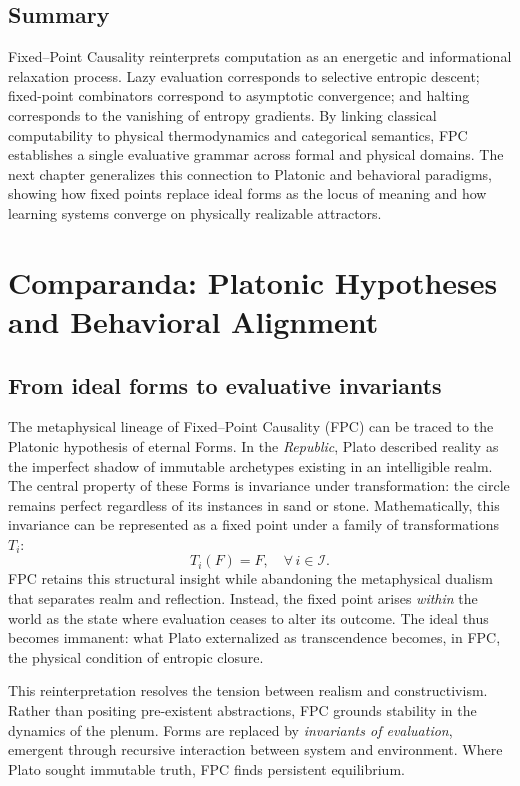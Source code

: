 \documentclass[12pt,a4paper]{article}
\theoremstyle{plain}
\begin{document}
\subsection{Summary}
Fixed--Point Causality reinterprets computation as an energetic and informational relaxation process.  
Lazy evaluation corresponds to selective entropic descent; 
fixed-point combinators correspond to asymptotic convergence; 
and halting corresponds to the vanishing of entropy gradients.
By linking classical computability to physical thermodynamics and categorical semantics, FPC establishes a single evaluative grammar across formal and physical domains.
The next chapter generalizes this connection to Platonic and behavioral paradigms, showing how fixed points replace ideal forms as the locus of meaning and how learning systems converge on physically realizable attractors.


\section{Comparanda: Platonic Hypotheses and Behavioral Alignment}
\label{sec:comparanda}

\subsection{From ideal forms to evaluative invariants}
The metaphysical lineage of Fixed--Point Causality (FPC) can be traced to the Platonic hypothesis of eternal Forms.  
In the \textit{Republic}, Plato described reality as the imperfect shadow of immutable archetypes existing in an intelligible realm.  
The central property of these Forms is invariance under transformation: the circle remains perfect regardless of its instances in sand or stone.  
Mathematically, this invariance can be represented as a fixed point under a family of transformations \(T_i\):
\[
T_i(F)=F , \quad \forall\, i \in \mathcal{I}.
\]
FPC retains this structural insight while abandoning the metaphysical dualism that separates realm and reflection.
Instead, the fixed point arises \emph{within} the world as the state where evaluation ceases to alter its outcome.
The ideal thus becomes immanent: what Plato externalized as transcendence becomes, in FPC, the physical condition of entropic closure.

This reinterpretation resolves the tension between realism and constructivism.
Rather than positing pre-existent abstractions, FPC grounds stability in the dynamics of the plenum.
Forms are replaced by \emph{invariants of evaluation}, emergent through recursive interaction between system and environment.
Where Plato sought immutable truth, FPC finds persistent equilibrium.
\end{document}
